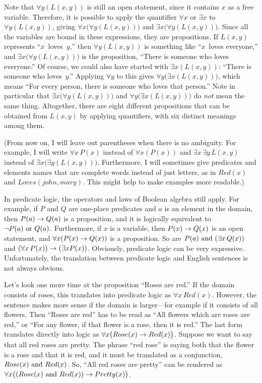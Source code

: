 Note that $\forall y(L(x,y))$ is still an open statement, since
it contains $x$ as a free variable.
Therefore, it is possible to
apply the quantifier $\forall x$ or $\exists x$ to $\forall y(L(x,y))$,
giving $\forall x\big(\forall y(L(x,y))\big)$ and
$\exists x\big(\forall y(L(x,y))\big)$.  Since all the variables are
bound in these expressions, they are propositions.  If $L(x,y)$ represents
``$x$~loves~$y$,'' then $\forall y(L(x,y))$ is something like ``$x$~loves
everyone,''  and $\exists x\big(\forall y(L(x,y))\big)$ is the
proposition, ``There is someone who loves everyone.''  Of course, we
could also have started with $\exists x(L(x,y))$: ``There is someone
who loves~$y$.''  Applying $\forall y$ to this gives 
$\forall y\big(\exists x(L(x,y))\big)$,
which means ``For every person, there is someone who loves that person.''
Note in particular that $\exists x\big(\forall y(L(x,y))\big)$ and
$\forall y\big(\exists x(L(x,y))\big)$ do \emph{not} mean the same thing.
Altogether, there are eight different propositions that can
be obtained from $L(x,y)$ by applying quantifiers, with six distinct
meanings among them.

(From now on, I will leave out parentheses when there is no ambiguity.
For example, I will write $\forall x\, P(x)$ instead of $\forall x(P(x))$
and $\exists x\,\exists y\,L(x,y)$ instead of
$\exists x\big(\exists y(L(x,y))\big)$.  Furthermore, I will
sometimes give predicates and elements names that are complete words
instead of just letters, as in  $Red(x)$ and $Loves(john,mary)$.
This might help to make examples more readable.)

\medbreak

In predicate logic, the operators and laws of Boolean algebra still
apply.  For example, if $P$ and $Q$ are one-place predicates and
$a$ is an element in the domain, then $P(a)\rightarrow Q(a)$
is a proposition, and it is logically equivalent to $\lnot P(a)\text{ or } Q(a)$.
Furthermore, if $x$ is a variable, then $P(x)\rightarrow Q(x)$ is an open
statement, and $\forall x(P(x)\rightarrow Q(x))$ is a proposition.
So are $P(a)\text{ and }(\exists x\,Q(x))$ and $(\forall x\,P(x))\rightarrow(\exists xP(x))$.
Obviously, predicate logic can be very expressive.  Unfortunately,
the translation between predicate logic and English sentences is not
always obvious.

Let's look one more time at the proposition ``Roses are red.''
If the domain consists of roses, this translates into
predicate logic as $\forall x\, Red(x)$.  However, the sentence makes
more sense if the domain is larger---for example if it
consists of all flowers.  Then ``Roses are red'' has to be read as
``All flowers which are roses are red,'' or ``For any flower,
if that flower is a rose, then it is red.'' The last form translates
directly into logic as $\forall x\big(Rose(x)\rightarrow Red(x)\big)$.
Suppose we want to say that all red roses are pretty.  The phrase
``red rose'' is saying both that the flower is a rose and that it is
red, and it must be translated as a conjunction, $Rose(x)\text{ and } Red(x)$.
So, ``All red roses are pretty'' can be rendered as
$\forall x\big((Rose(x)\text{ and } Red(x))\rightarrow Pretty(x)\big)$.

